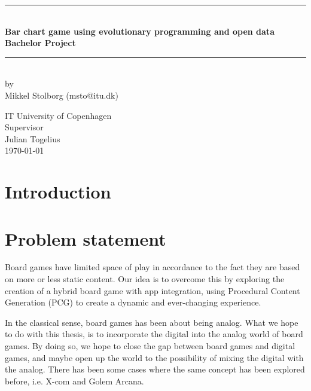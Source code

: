 \documentclass[a4paper,11pt]{article}
\begin{document}
\lstset{language=C}  
\begin{titlepage}

\centering \parindent=0pt
\newcommand{\HRule}{\rule{\textwidth}{1mm}}
 \HRule\\[1cm]\large\bfseries
Bar chart game using evolutionary programming and open data\\[0.7cm]
\large Bachelor Project\\[1cm]
\HRule\\[1cm]

\large by 
\\Mikkel Stolborg (msto@itu.dk)
 \normalsize
\begin{flushleft}
IT University of Copenhagen \\
Supervisor\\
Julian Togelius\\
\today \end{flushleft}
\end{titlepage}

\begin{abstract}

\end{abstract}
\pagebreak
\tableofcontents
\pagebreak
\section{Introduction}

\section{Problem statement}
Board games have limited space of play in accordance to the fact they are based on more or less static content. Our idea is to overcome this by exploring the creation of a hybrid board game  with app integration, using Procedural Content Generation (PCG) to create a dynamic and ever-changing experience.

In the classical sense, board games has been about being analog. What we hope to do with this thesis, is to incorporate the digital into the analog world of board games. By doing so, we hope to close the gap between board games and digital games, and maybe open up the world to the possibility of mixing the digital with the analog. There has been some cases where the same concept has been explored before, i.e. X-com and Golem Arcana.
\end{document}
